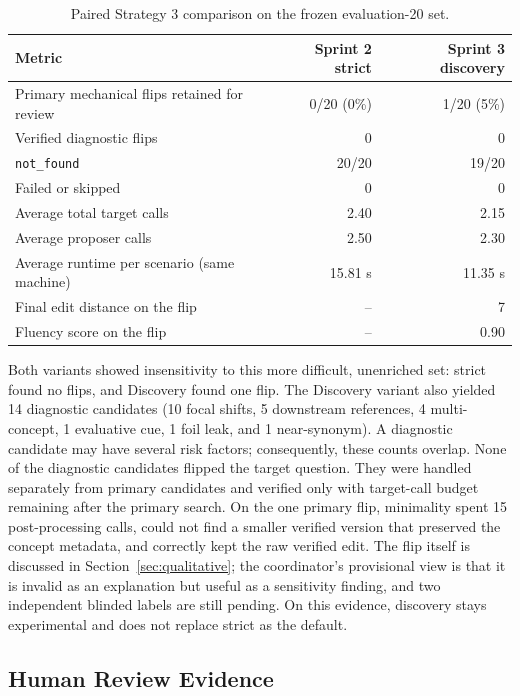 \documentclass[11pt,a4paper]{article}
\begin{document}
\begin{table}[htbp]
\centering
\small
\begin{tabularx}{\textwidth}{@{}Y r r@{}}
\toprule
\textbf{Metric} & \textbf{Sprint 2 strict} & \textbf{Sprint 3 discovery} \\
\midrule
Primary mechanical flips retained for review & 0/20 (0\%) & 1/20 (5\%) \\
Verified diagnostic flips & 0 & 0 \\
\texttt{not\_found} & 20/20 & 19/20 \\
Failed or skipped & 0 & 0 \\
Average total target calls & 2.40 & 2.15 \\
Average proposer calls & 2.50 & 2.30 \\
Average runtime per scenario (same machine) & 15.81 s & 11.35 s \\
Final edit distance on the flip & -- & 7 \\
Fluency score on the flip & -- & 0.90 \\
\bottomrule
\end{tabularx}
\caption{Paired Strategy 3 comparison on the frozen evaluation-20 set.}
\label{tab:s3}
\end{table}

Both variants showed insensitivity to this more difficult, unenriched set: strict
found no flips, and Discovery found one flip. The Discovery variant also yielded 14
diagnostic candidates (10 focal shifts, 5 downstream references, 4 multi-concept, 1
evaluative cue, 1 foil leak, and 1 near-synonym). A diagnostic candidate may have
several risk factors; consequently, these counts overlap. None of the diagnostic
candidates flipped the target question. They were handled separately from primary
candidates and verified only with target-call budget remaining after the primary search. On the
one primary flip, minimality spent 15 post-processing calls, could not
find a smaller verified version that preserved the concept metadata, and correctly
kept the raw verified edit. The flip itself is discussed in
Section~\ref{sec:qualitative}; the coordinator's provisional view is that it is
invalid as an explanation but useful as a sensitivity finding, and two independent
blinded labels are still pending. On this evidence, discovery stays experimental and
does not replace strict as the default.

\subsection{Human Review Evidence}
\label{sec:review}
\end{document}
